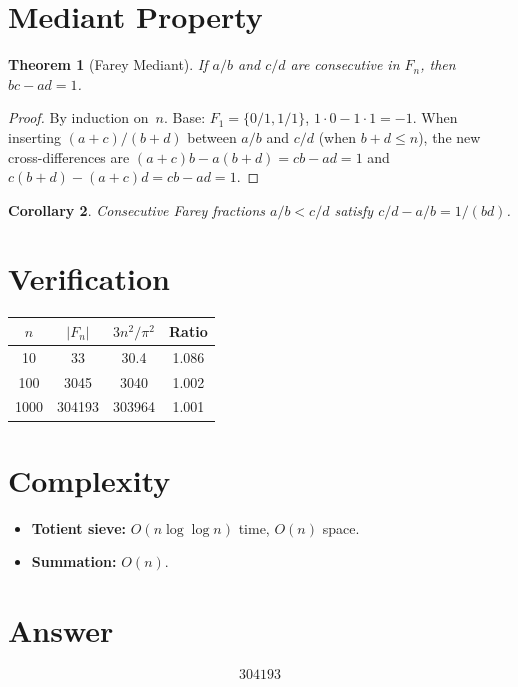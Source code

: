 \documentclass[11pt]{article}
\newtheorem{theorem}{Theorem}
\newtheorem{corollary}[theorem]{Corollary}
\begin{document}
\section{Mediant Property}

\begin{theorem}[Farey Mediant]
If $a/b$ and $c/d$ are consecutive in $F_n$, then $bc - ad = 1$.
\end{theorem}

\begin{proof}
By induction on~$n$. Base: $F_1 = \{0/1, 1/1\}$, $1 \cdot 0 - 1 \cdot 1 = -1$. When inserting $(a+c)/(b+d)$ between $a/b$ and $c/d$ (when $b+d \le n$), the new cross-differences are $(a+c)b - a(b+d) = cb - ad = 1$ and $c(b+d) - (a+c)d = cb - ad = 1$.
\end{proof}

\begin{corollary}
Consecutive Farey fractions $a/b < c/d$ satisfy $c/d - a/b = 1/(bd)$.
\end{corollary}

\section{Verification}

\begin{center}
\begin{tabular}{cccc}
\toprule
$n$ & $|F_n|$ & $3n^2/\pi^2$ & Ratio \\
\midrule
10   & 33      & 30.4    & 1.086 \\
100  & 3045    & 3040    & 1.002 \\
1000 & 304193  & 303964  & 1.001 \\
\bottomrule
\end{tabular}
\end{center}

\section{Complexity}

\begin{itemize}
\item \textbf{Totient sieve:} $O(n\log\log n)$ time, $O(n)$ space.
\item \textbf{Summation:} $O(n)$.
\end{itemize}

\section{Answer}

\[
\boxed{304193}
\]
\end{document}
